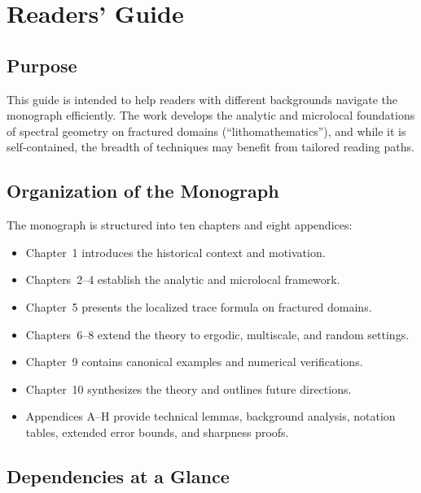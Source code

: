 
\chapter*{Readers' Guide}
\label{chap:readers-guide}

\section*{Purpose}

This guide is intended to help readers with different backgrounds navigate the
monograph efficiently. The work develops the analytic and microlocal foundations
of spectral geometry on fractured domains (``lithomathematics''), and while it
is self-contained, the breadth of techniques may benefit from tailored reading
paths.

\section*{Organization of the Monograph}

The monograph is structured into ten chapters and eight appendices:

\begin{itemize}
  \item Chapter~1 introduces the historical context and motivation.
  \item Chapters~2–4 establish the analytic and microlocal framework.
  \item Chapter~5 presents the localized trace formula on fractured domains.
  \item Chapters~6–8 extend the theory to ergodic, multiscale, and random settings.
  \item Chapter~9 contains canonical examples and numerical verifications.
  \item Chapter~10 synthesizes the theory and outlines future directions.
  \item Appendices A–H provide technical lemmas, background analysis,
        notation tables, extended error bounds, and sharpness proofs.
\end{itemize}

\section*{Dependencies at a Glance}

